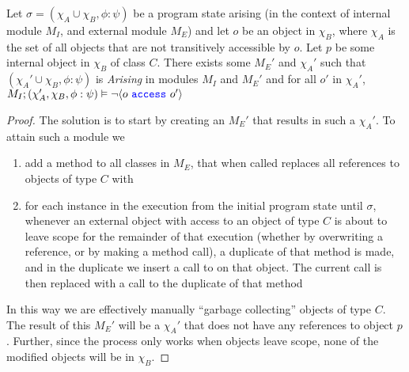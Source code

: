 \begin{lemma}
\label{lemma:garbage}
Let $\sigma = (\chi_A \cup \chi_B, \phi : \psi)$ be a program state arising (in the context of internal module $M_I$, and external module $M_E$)
and let $o$ be an object in $\chi_B$, where $\chi_A$ is the set of all objects that are 
not transitively accessible by $o$. Let $p$ be some internal object in $\chi_B$ of class $C$. There exists some 
$M_E'$ and $\chi_A'$ such that $(\chi_A' \cup \chi_B, \phi : \psi)$ is \textit{Arising}
in modules $M_I$ and $M_E'$ and for all $o'$ in $\chi_A'$, $M_I; (\chi_A', \chi_B, \phi : \psi) \vDash \neg \langle o\ {\color{blue}\texttt{access}}\ o' \rangle$
\end{lemma}
\begin{proof}
The solution is to start by creating an $M_E'$ that results in such a $\chi_A'$. To attain such a module we
\begin{enumerate}
\item
add a  method to all classes in $M_E$, that when called replaces all references to objects of type $C$ with 
\item
for each instance in the execution from the initial program state until $\sigma$, whenever an external object with 
access to an object of type $C$ is about to leave scope for the remainder of that execution (whether by overwriting a reference, or by making a method call),
a duplicate of that method is made, and in the duplicate we insert a call to  on that object. The current call 
is then replaced with a call to the duplicate of that method
\end{enumerate}
In this way we are effectively manually ``garbage collecting'' objects of type $C$. The result of this $M_E'$ will be a $\chi_A'$ that does not have
any references to object $p$. Further, since the process only works when objects leave scope, none of the modified objects will be in $\chi_B$.
\end{proof}

